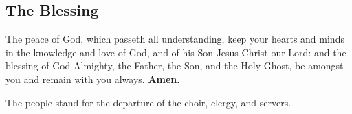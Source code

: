 \subsection{The Blessing}



The peace of God, which passeth all understanding, keep your hearts and minds
in the knowledge and love of God, and of his Son Jesus Christ our Lord: and the
blessing of God Almighty, \cross the Father, the Son, and the Holy Ghost, be amongst
you and remain with you always. \textbf{Amen.}

\begin{rubric}
The people stand for the departure of the choir, clergy, and servers.
\end{rubric}

\clearpage
